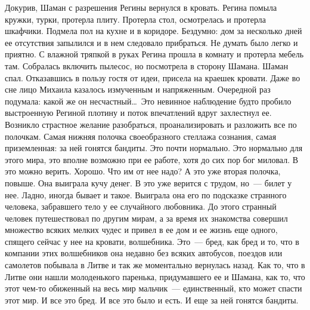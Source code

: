 Докурив, Шаман с разрешения Регины вернулся в кровать. Регина помыла кружки, 
турки, протерла плиту. Протерла стол, осмотрелась и протерла шкафчики. Подмела 
пол на кухне и в коридоре. Бездумно: дом за несколько дней ее отсутствия 
запылился и в нем следовало прибраться. Не думать было легко и приятно. С 
влажной тряпкой в руках Регина прошла в комнату и протерла мебель там. 
Собралась включить пылесос, но посмотрела в сторону Шамана. Шаман спал. Отказавшись в 
пользу гостя от идеи, присела на краешек кровати. Даже во сне лицо Михаила 
казалось измученным и напряженным. Очередной раз подумала: какой же он 
несчастный\ldots\ Это невинное наблюдение будто пробило выстроенную Региной 
плотину и поток впечатлений вдруг захлестнул ее. Возникло страстное желание разобраться, 
проанализировать и разложить все по полочкам. Самая нижняя полочка 
своеобразного стеллажа сознания, самая приземленная: за ней гонятся бандиты. Это почти 
нормально. Это нормально для этого мира, это вполне возможно при ее работе, 
хотя до сих пор бог миловал. В это можно верить. Хорошо. Что им от нее надо? А это 
уже вторая полочка, повыше. Она выиграла кучу денег. В это уже верится с 
трудом, но~--- билет у нее. Ладно, иногда бывает и такое. Выиграла она его по подсказке 
странного человека, забравшего тело у ее случайного любовника. До этого 
странный человек путешествовал по другим мирам, а за время их знакомства совершил 
множество всяких мелких чудес и привел в ее дом и ее жизнь еще одного, спящего 
сейчас у нее на кровати, волшебника. Это~--- бред, как бред и то, что в 
компании этих волшебников она недавно без всяких автобусов, поездов или самолетов 
побывала в Литве и так же моментально вернулась назад. Как то, что в Литве они 
нашли молоденького паренька, придумавшего ее и Шамана, как то, что этот чем-то 
обиженный на весь мир мальчик~--- единственный, кто может спасти этот мир. И 
все это бред. И все это было и есть. И еще за ней гонятся бандиты.

